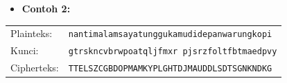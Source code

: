 \documentclass{article}
\begin{document}

\begin{itemize}
    \item[$\bullet$] \textbf{Contoh 2:}
\end{itemize}

\begin{tabular}{ll}
    Plainteks: & \texttt{nantimalamsayatunggukamudidepanwarungkopi} \\
    Kunci: & \texttt{gtrskncvbrwpoatqljfmxr pjsrzfoltfbtmaedpvy} \\
    Cipherteks: & \texttt{TTELSZCGBDOPMAMKYPLGHTDJMAUDDLSDTSGNKNDKG}
\end{tabular}
\end{document}
